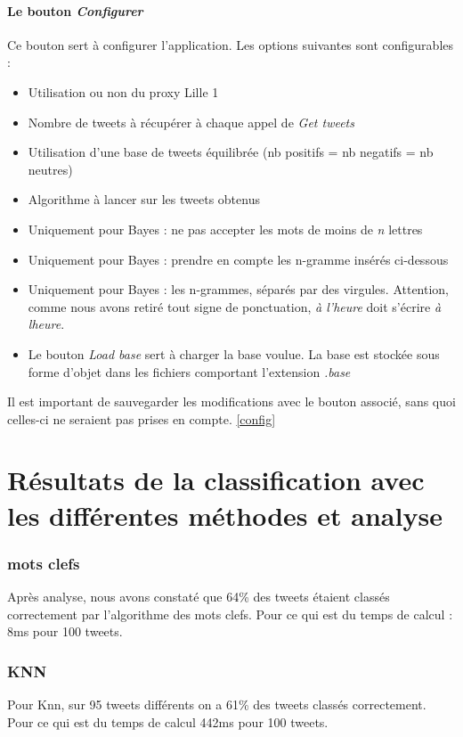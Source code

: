 \documentclass[a4paper,10pt]{report}
\begin{document}
      \subsubsection{Le bouton \textit{Configurer}}
	Ce bouton sert à configurer l'application. Les options suivantes sont configurables :
	\begin{itemize}
	 \item Utilisation ou non du proxy Lille 1
	 \item Nombre de tweets à récupérer à chaque appel de \textit{Get tweets}
	 \item Utilisation d'une base de tweets équilibrée (nb positifs = nb negatifs = nb neutres)
	 \item Algorithme à lancer sur les tweets obtenus
	 \item Uniquement pour Bayes : ne pas accepter les mots de moins de \textit{n} lettres
	 \item Uniquement pour Bayes : prendre en compte les n-gramme insérés ci-dessous
	 \item Uniquement pour Bayes : les n-grammes, séparés par des virgules. Attention, comme nous avons retiré tout signe de ponctuation, \textit{à l'heure} doit s'écrire \textit{à lheure}.
	 \item Le bouton \textit{Load base} sert à charger la base voulue. La base est stockée sous forme d'objet dans les fichiers comportant l'extension \textit{.base}
	\end{itemize}
	Il est important de sauvegarder les modifications avec le bouton associé, sans quoi celles-ci ne seraient pas prises en compte.
	\ref{config}
\chapter{Résultats de la classification avec les différentes méthodes et analyse}
    \subsection{mots clefs}
      Après analyse, nous avons constaté que 64\% des tweets étaient classés correctement par l'algorithme des mots clefs.
      Pour ce qui est du temps de calcul : 8ms pour 100 tweets. 
    \subsection{KNN}
      Pour Knn, sur 95 tweets différents on a 61\% des tweets classés correctement.
      Pour ce qui est du temps de calcul 442ms pour 100 tweets.
\end{document}
